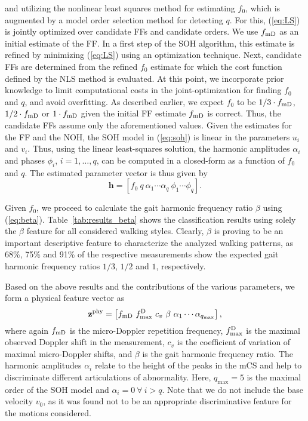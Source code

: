 and utilizing the nonlinear least squares method for estimating $f_0$, which is augmented by a model order selection method for detecting $q$. For this, (\ref{eq:LS}) is jointly optimized over candidate FFs and candidate orders. We use ${f_\text{mD}}$ as an initial estimate of the FF. In a first step of the SOH algorithm, this estimate is refined by minimizing (\ref{eq:LS}) using an optimization technique. Next, candidate FFs are determined from the refined $f_0$ estimate for which the cost function defined by the NLS method is evaluated. At this point, we incorporate prior knowledge to limit computational costs in the joint-optimization for finding $f_0$ and $q$, and avoid overfitting. As described earlier, we expect $f_0$ to be $1/3 \cdot {f_\text{mD}}$, $1/2 \cdot {f_\text{mD}}$ or $1 \cdot {f_\text{mD}}$ given the initial FF estimate ${f_\text{mD}}$ is correct. Thus, the candidate FFs assume only the aforementioned values.  
Given the estimates for the FF and the NOH, the SOH model in (\ref{eq:soh}) is linear in the parameters $u_i$ and $v_i$. Thus, using the linear least-squares solution, the harmonic amplitudes $\alpha_i$ and phases $\phi_i$, $i=1,\dots,q$, can be computed in a closed-form as a function of $f_0$ and $q$. The estimated parameter vector is thus given by
\begin{equation}
\mathbf{h} = \left[ f_0~q~\alpha_1 \cdots \alpha_q ~\phi_1 \cdots \phi_q \right].
\label{eq:SOHparas}
\end{equation}

Given $f_0$, we proceed to calculate the gait harmonic frequency ratio $\beta$ using (\ref{eq:beta}). Table~\ref{tab:results_beta} shows the classification results using solely the $\beta$ feature for all considered walking styles. Clearly, $\beta$ is proving to be an important descriptive feature to characterize the analyzed walking patterns, as 68\%, 75\% and 91\% of the respective measurements show the expected gait harmonic frequency ratios $1/3$, $1/2$ and $1$, respectively. 

Based on the above results and the contributions of the various parameters, we form a physical feature vector as
\begin{equation}
\mathbf{z}^\text{phy} = \left[{f_\text{mD}}~{f^\mathrm{D}_\text{max}}~c_v~\beta~\alpha_1 \cdots \alpha_{q_\text{max}} \right],
\label{eq:phyfeat}
\end{equation}
where again ${f_\text{mD}}$ is the micro-Doppler repetition frequency, ${f^\mathrm{D}_\text{max}}$ is the maximal observed Doppler shift in the measurement, $c_v$ is the coefficient of variation of maximal micro-Doppler shifts, and $\beta$ is the gait harmonic frequency ratio. The harmonic amplitudes $\alpha_i$ relate to the height of the peaks in the mCS and help to discriminate different articulations of abnormality. Here, $q_\text{max}=5$ is the maximal order of the SOH model and $\alpha_i = 0~\forall~i > q$. Note that we do not include the base velocity $v_0$, as it was found not to be an appropriate discriminative feature for the motions considered.

